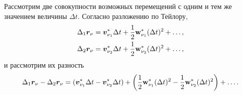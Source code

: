 Рассмотрим две совокупности возможных перемещений с одним и тем же значением величины $\Delta t$. Согласно разложению по Тейлору,
\begin{align*}
    \Delta_1 \mbox{\boldmath $r$}_\nu = \mbox{\boldmath $v$}_{\nu_1}^* \Delta t + \frac{1}{2} \mbox{\boldmath $\mathrm{w}$}_{\nu_1}^* (\Delta t)^2 + \ldots, \\
    \Delta_2 \mbox{\boldmath $r$}_\nu = \mbox{\boldmath $v$}_{\nu_2}^* \Delta t + \frac{1}{2} \mbox{\boldmath $\mathrm{w}$}_{\nu_2}^* (\Delta t)^2 + \ldots, 
\end{align*}
и рассмотрим их разность
$$
        \Delta_1 \mbox{\boldmath $r$}_\nu - \Delta_2 \mbox{\boldmath $r$}_\nu = (\mbox{\boldmath $v$}_{\nu_1}^* \Delta t - \mbox{\boldmath $v$}_{\nu_2}^* \Delta t) + \left(\frac{1}{2} \mbox{\boldmath $\mathrm{w}$}_{\nu_1}^* (\Delta t)^2 - \frac{1}{2} \mbox{\boldmath $\mathrm{w}$}_{\nu_2}^* (\Delta t)^2\right) + \ldots.
$$



